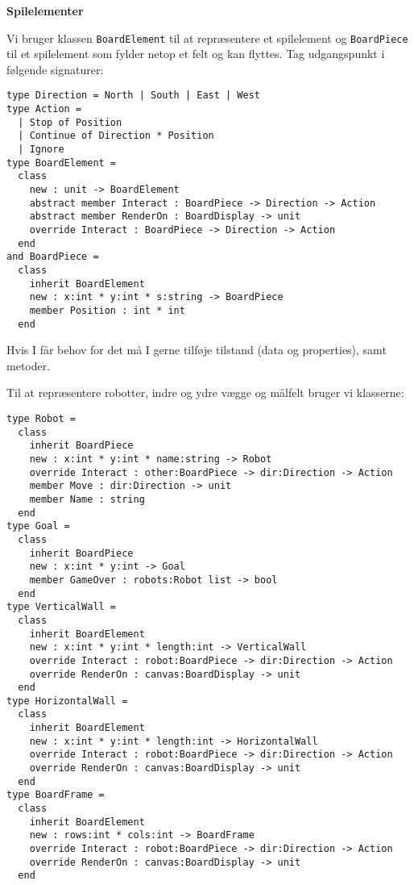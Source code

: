 \textbf{Spilelementer}




Vi bruger klassen \lstinline{BoardElement} til at repræsentere et
spilelement og \lstinline{BoardPiece} til et spilelement som fylder
netop et felt og kan flyttes. Tag udgangspunkt i
følgende signaturer:

\begin{lstlisting}
type Direction = North | South | East | West
type Action =
  | Stop of Position
  | Continue of Direction * Position
  | Ignore
type BoardElement =
  class
    new : unit -> BoardElement
    abstract member Interact : BoardPiece -> Direction -> Action
    abstract member RenderOn : BoardDisplay -> unit
    override Interact : BoardPiece -> Direction -> Action
  end
and BoardPiece =
  class
    inherit BoardElement
    new : x:int * y:int * s:string -> BoardPiece
    member Position : int * int
  end
\end{lstlisting}

Hvis I får behov for det må I gerne tilføje tilstand (data og
properties), samt metoder.

Til at repræsentere robotter, indre og ydre vægge og målfelt bruger vi klasserne:

\begin{lstlisting}
type Robot =
  class
    inherit BoardPiece
    new : x:int * y:int * name:string -> Robot
    override Interact : other:BoardPiece -> dir:Direction -> Action
    member Move : dir:Direction -> unit
    member Name : string
  end
type Goal =
  class
    inherit BoardPiece
    new : x:int * y:int -> Goal
    member GameOver : robots:Robot list -> bool
  end
type VerticalWall =
  class
    inherit BoardElement
    new : x:int * y:int * length:int -> VerticalWall
    override Interact : robot:BoardPiece -> dir:Direction -> Action
    override RenderOn : canvas:BoardDisplay -> unit
  end
type HorizontalWall =
  class
    inherit BoardElement
    new : x:int * y:int * length:int -> HorizontalWall
    override Interact : robot:BoardPiece -> dir:Direction -> Action
    override RenderOn : canvas:BoardDisplay -> unit
  end
type BoardFrame =
  class
    inherit BoardElement
    new : rows:int * cols:int -> BoardFrame
    override Interact : robot:BoardPiece -> dir:Direction -> Action
    override RenderOn : canvas:BoardDisplay -> unit
  end
\end{lstlisting}


